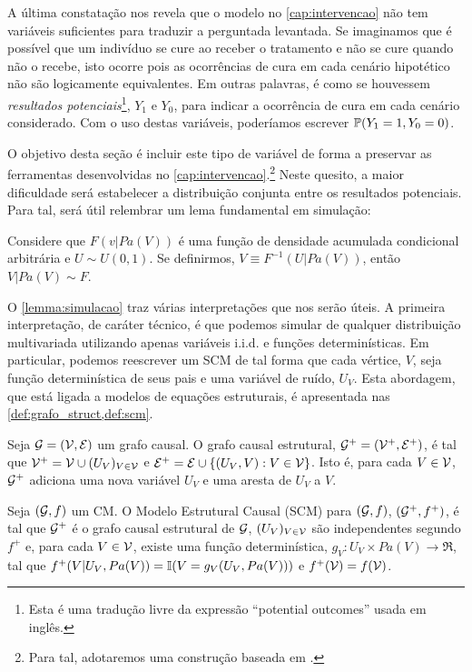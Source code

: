 A última constatação nos revela que
o modelo no \cref{cap:intervencao}
não tem variáveis suficientes para
traduzir a perguntada levantada.
Se imaginamos que é possível que
um indivíduo se cure ao receber o tratamento e
não se cure quando não o recebe, 
isto ocorre pois as ocorrências de cura
em cada cenário hipotético não são 
logicamente equivalentes.
Em outras palavras, é como se 
houvessem \textit{resultados potenciais}\footnote{
 Esta é uma tradução livre da expressão
 ``potential outcomes'' usada em inglês.},
$Y_1$ e $Y_0$, para
indicar a ocorrência de cura em
cada cenário considerado.
Com o uso destas variáveis, 
poderíamos escrever 
$\P(Y_1 = 1, Y_0 = 0)$.

O objetivo desta seção é 
incluir este tipo de variável de forma
a preservar as ferramentas desenvolvidas
no \cref{cap:intervencao}.\footnote{
 Para tal, adotaremos uma construção
 baseada em \citet{Galles1998}.
}
Neste quesito, a maior dificuldade será
estabelecer a distribuição conjunta
entre os resultados potenciais.
Para tal, será útil relembrar
um lema fundamental em simulação:

\begin{lemma}
 \label{lemma:simulacao}
 Considere que $F(v|Pa(V))$ é
 uma função de densidade acumulada condicional arbitrária e
 $U \sim U(0,1)$. Se definirmos,
 $V \equiv F^{-1}(U|Pa(V))$, então
 $V|Pa(V) \sim F$.
\end{lemma}

O \cref{lemma:simulacao} traz 
várias interpretações que nos serão úteis.
A primeira interpretação, de caráter técnico, é 
que podemos simular de 
qualquer distribuição multivariada utilizando apenas
variáveis i.i.d. e funções determinísticas.
Em particular, podemos 
reescrever um SCM de tal forma que
cada vértice, $V$, seja função determinística
de seus pais e uma variável de ruído, $U_V$.
Esta abordagem, que está ligada a
modelos de equações estruturais, é
apresentada nas \cref{def:grafo_struct,def:scm}.

\begin{definition}
 \label{def:grafo_struct}
 Seja $\sG = (\sV, \sE)$ um grafo causal.
 O grafo causal estrutural,
 $\sG^+ = (\sV^+, \sE^+)$, é tal que 
 $\sV^+ = \sV \cup (U_V)_{V \in \sV}$ e
 $\sE^+ = \sE \cup \{(U_V, V): V \in \sV\}$.
 Isto é, para cada $V \in \sV$, 
 $\sG^+$ adiciona uma nova variável $U_V$ e
 uma aresta de $U_V$ a $V$.
\end{definition} 
 
\begin{definition}
 \label{def:scm}
 Seja $(\sG,f)$ um CM.
 O Modelo Estrutural Causal (SCM) para $(\sG,f)$, 
 $(\sG^+,f^+)$, é tal que
 $\sG^+$ é o grafo causal estrutural de $\sG$,
 $(U_V)_{V \in \sV}$ são independentes segundo $f^+$ e,
 para cada $V \in \sV$, existe uma função determinística, 
 $g_V: U_V \times Pa(V) \rightarrow \Re$,
 tal que $f^+(V|U_V,Pa(V)) = \I(V = g_V(U_V, Pa(V)))$ e
 $f^+(\sV) = f(\sV)$.
\end{definition}
 
